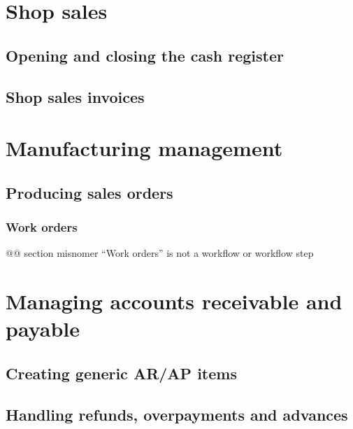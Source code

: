 \chapter{Shop sales}
\label{cha-workflows-shop-sales}

\section{Opening and closing the cash register}
\label{sec-workflows-shop-register-opening-closing}

\section{Shop sales invoices}
\label{sec-workflows-shop-invoicing}

\chapter{Manufacturing management}
\label{cha-workflows-manufacturing}

\section{Producing sales orders}
\label{sec-workflows-manufacturing-producing-orders}

\subsection{Work orders}
\label{sec-workflows-manufacturing-work-orders}

@@ section misnomer ``Work orders'' is not a workflow or workflow step

\chapter{Managing accounts receivable and payable}
\label{cha-workflows-managing-ar/ap}

\section{Creating generic AR/AP items}
\label{sec-workflows-managing-ar/ap-item-creation}

\section{Handling refunds, overpayments and advances}
\label{sec-workflows-managing-ar/ap-overpayments}


